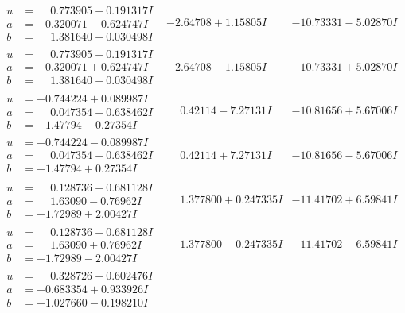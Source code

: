 \documentclass[1p]{elsarticle_modified}
\theoremstyle{definition}
\begin{document}
$$\begin{array}{c|c|c}
\begin{aligned}
u &= \phantom{-}0.773905 + 0.191317 I \\
a &= -0.320071 - 0.624747 I \\
b &= \phantom{-}1.381640 - 0.030498 I\end{aligned}
 & -2.64708 + 1.15805 I & -10.73331 - 5.02870 I \\ \hline\begin{aligned}
u &= \phantom{-}0.773905 - 0.191317 I \\
a &= -0.320071 + 0.624747 I \\
b &= \phantom{-}1.381640 + 0.030498 I\end{aligned}
 & -2.64708 - 1.15805 I & -10.73331 + 5.02870 I \\ \hline\begin{aligned}
u &= -0.744224 + 0.089987 I \\
a &= \phantom{-}0.047354 - 0.638462 I \\
b &= -1.47794 - 0.27354 I\end{aligned}
 & \phantom{-}0.42114 - 7.27131 I & -10.81656 + 5.67006 I \\ \hline\begin{aligned}
u &= -0.744224 - 0.089987 I \\
a &= \phantom{-}0.047354 + 0.638462 I \\
b &= -1.47794 + 0.27354 I\end{aligned}
 & \phantom{-}0.42114 + 7.27131 I & -10.81656 - 5.67006 I \\ \hline\begin{aligned}
u &= \phantom{-}0.128736 + 0.681128 I \\
a &= \phantom{-}1.63090 - 0.76962 I \\
b &= -1.72989 + 2.00427 I\end{aligned}
 & \phantom{-}1.377800 + 0.247335 I & -11.41702 + 6.59841 I \\ \hline\begin{aligned}
u &= \phantom{-}0.128736 - 0.681128 I \\
a &= \phantom{-}1.63090 + 0.76962 I \\
b &= -1.72989 - 2.00427 I\end{aligned}
 & \phantom{-}1.377800 - 0.247335 I & -11.41702 - 6.59841 I \\ \hline\begin{aligned}
u &= \phantom{-}0.328726 + 0.602476 I \\
a &= -0.683354 + 0.933926 I \\
b &= -1.027660 - 0.198210 I\end{aligned}

\end{array}$$
\end{document}
